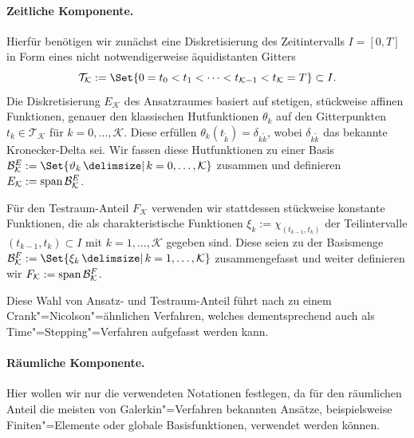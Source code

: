 \documentclass[../main.tex]{subfiles}
\begin{document}
\paragraph{Zeitliche Komponente.} %
\label{par:zeitliche_komponente}

Hierfür benötigen wir zunächst eine Diskretisierung des Zeitintervalls $I = [0, T]$ in Form eines nicht notwendigerweise äquidistanten Gitters
\begin{equation}\label{eq:zeitgitter}
    \mathcal T_{\mathcal K} := \Set{0 = t_0 < t_1 < \dots < t_{\mathcal K - 1} < t_{\mathcal K} = T} \subset I.
\end{equation}
Die Diskretisierung $E_{\mathcal K}$ des Ansatzraumes basiert auf stetigen, stückweise affinen Funktionen, genauer den klassischen Hutfunktionen $\theta_{k}$ auf den Gitterpunkten $t_{k} \in \mathcal T_{\mathcal K}$ für $k = 0, \dots, \mathcal K$.
Diese erfüllen $\theta_{k}(t_{\tilde{k}}) = \delta_{k \tilde k}$, wobei $\delta_{k \tilde k}$ das bekannte Kronecker-Delta sei.
Wir fassen diese Hutfunktionen zu einer Basis $\mathcal B^{E}_{\mathcal K} := \Set{ \theta_{k} \given k = 0, \dots, \mathcal K }$ zusammen und definieren $E_{\mathcal K} := \operatorname{span} \mathcal B^{E}_{\mathcal K}$.

Für den Testraum-Anteil $F_{\mathcal K}$ verwenden wir stattdessen stückweise konstante Funktionen, die als charakteristische Funktionen $\xi_{k} := \chi_{(t_{k-1}, t_{k})}$ der Teilintervalle $(t_{k - 1}, t_{k}) \subset I$ mit $k = 1, \dots, \mathcal K$ gegeben sind.
Diese seien zu der Basismenge $\mathcal B^{F}_{\mathcal K} := \Set{ \xi_{k} \given k = 1, \dots, \mathcal K}$ zusammengefasst und weiter definieren wir $F_{\mathcal K} := \operatorname{span} \mathcal B^{F}_{\mathcal K}$.

Diese Wahl von Ansatz- und Testraum-Anteil führt nach \cite{Andreev:2012ep} zu einem Crank"=Nicolson"=ähnlichen Verfahren, welches dementsprechend auch als Time"=Stepping"=Verfahren aufgefasst werden kann.


\paragraph{Räumliche Komponente.} %
\label{par:raeumliche_komponente}

Hier wollen wir nur die verwendeten Notationen festlegen, da für den räumlichen Anteil die meisten von Galerkin"=Verfahren bekannten Ansätze, beispielsweise Finiten"=Elemente oder globale Basisfunktionen, verwendet werden können.
\end{document}
